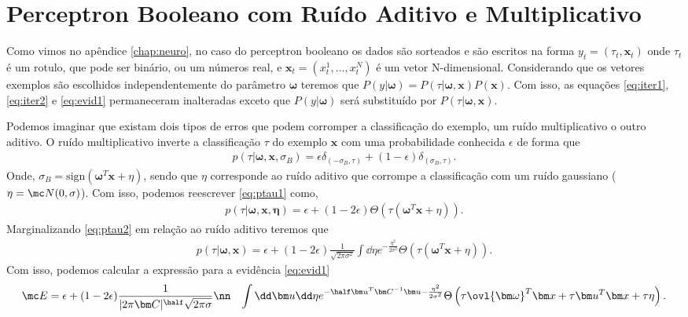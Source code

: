 \section{Perceptron Booleano com Ruído Aditivo e Multiplicativo} %
\label{sec:PB} 

Como vimos no apêndice \ref{chap:neuro}, no caso do perceptron booleano os dados
são sorteados e são escritos na forma $y_t = ( \tau_t, \bm x_t )$ onde $\tau_t$
é um rotulo, que pode ser binário, ou um números real,  e $ \bm x_t =
(x_t^1, \ldots, x_t^N) $ é um vetor N-dimensional.
Considerando que os vetores exemplos são escolhidos independentemente do
parâmetro $\bm \omega$ teremos que   $P(y|\bm \omega) = P(\tau|\bm \omega, \bm
x ) P(\bm x )$.  Com isso,  as equações \eqref{eq:iter1}, \eqref{eq:iter2}
e \eqref{eq:evid1} permaneceram inalteradas exceto que $P(y|\bm \omega)$ será
substituído por $P(\tau|\bm \omega, \bm x)$.  

Podemos imaginar que existam dois tipos de erros que podem corromper a
classificação do exemplo, um ruído multiplicativo o outro aditivo. O
ruído multiplicativo  inverte a classificação $\tau$ do exemplo $\bm x$
com uma probabilidade conhecida $\epsilon$ de forma que
\begin{align}
    p(\tau|\bm \omega, \bm x,\sigma_B) = \epsilon \delta_{(-\sigma_B,\tau)}
                               + (1-\epsilon) \delta_{(\sigma_B,\tau)}.
\label{eq:ptau1}
\end{align}
Onde, $\sigma_B = \mathrm{sign}(\bm \omega^T\bm x + \eta)$, sendo que $\eta$
corresponde ao ruído aditivo que corrompe a classificação com um ruído
gaussiano ($ \eta = \mc N ( 0,\sigma)$). Com isso, podemos reescrever 
\eqref{eq:ptau1} como, 
\begin{align}
    p(\tau|\bm \omega, \bm x,\bm\eta) = \epsilon  + (1-2\epsilon) \Theta\left(
                     \tau\left( \bm \omega^T \bm x + \eta \right)\right).
\label{eq:ptau2}
\end{align}
Marginalizando \eqref{eq:ptau2} em relação ao ruído aditivo teremos que
\begin{align}
    p(\tau|\bm \omega, \bm x) = \epsilon + (1-2\epsilon) 
        \frac{1}{\sqrt{2\pi\sigma^2}}\int \dd\eta 
        e^{-\frac{\eta^2}{2\sigma^2} }
        \Theta\left(\tau\left( \bm \omega^T \bm x + \eta \right)\right).
\label{eq:ptau3}
\end{align}
Com isso, podemos calcular a expressão para a evidência \eqref{eq:evid1}
\begin{align}
\mc E & = 
    \epsilon + (1-2\epsilon) \frac{1}{|2\pi\bm C|^\half\sqrt{2\pi\sigma}}\nn
    &\int\dd \bm u \dd \eta 
    e^{-\half \bm u^T \bm C^{-1} \bm u
    -\frac{\eta^2}{2\sigma^2} }
    \Theta\left(\tau\ovl{\bm \omega}^T\bm x + \tau\bm u^T\bm x + 
                                \tau\eta \right).
\label{eq:evid2}
\end{align}

